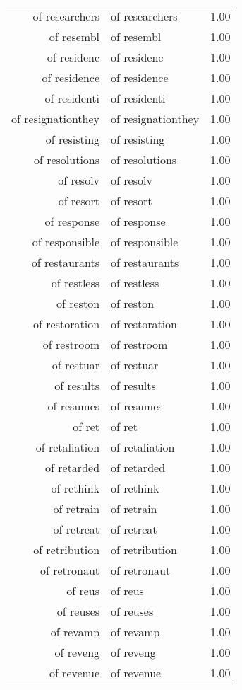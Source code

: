 \begin{table}[ht]
\begin{tabular}{rlr}
  of researchers & of researchers & 1.00 \\ 
  of resembl & of resembl & 1.00 \\ 
  of residenc & of residenc & 1.00 \\ 
  of residence & of residence & 1.00 \\ 
  of residenti & of residenti & 1.00 \\ 
  of resignationthey & of resignationthey & 1.00 \\ 
  of resisting & of resisting & 1.00 \\ 
  of resolutions & of resolutions & 1.00 \\ 
  of resolv & of resolv & 1.00 \\ 
  of resort & of resort & 1.00 \\ 
  of response & of response & 1.00 \\ 
  of responsible & of responsible & 1.00 \\ 
  of restaurants & of restaurants & 1.00 \\ 
  of restless & of restless & 1.00 \\ 
  of reston & of reston & 1.00 \\ 
  of restoration & of restoration & 1.00 \\ 
  of restroom & of restroom & 1.00 \\ 
  of restuar & of restuar & 1.00 \\ 
  of results & of results & 1.00 \\ 
  of resumes & of resumes & 1.00 \\ 
  of ret & of ret & 1.00 \\ 
  of retaliation & of retaliation & 1.00 \\ 
  of retarded & of retarded & 1.00 \\ 
  of rethink & of rethink & 1.00 \\ 
  of retrain & of retrain & 1.00 \\ 
  of retreat & of retreat & 1.00 \\ 
  of retribution & of retribution & 1.00 \\ 
  of retronaut & of retronaut & 1.00 \\ 
  of reus & of reus & 1.00 \\ 
  of reuses & of reuses & 1.00 \\ 
  of revamp & of revamp & 1.00 \\ 
  of reveng & of reveng & 1.00 \\ 
  of revenue & of revenue & 1.00 \\ 

\end{tabular}
\end{table}

